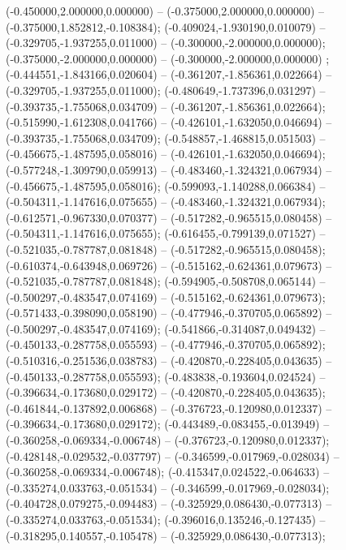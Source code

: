  (-0.450000,2.000000,0.000000) -- (-0.375000,2.000000,0.000000) -- (-0.375000,1.852812,-0.108384);
 (-0.409024,-1.930190,0.010079) -- (-0.329705,-1.937255,0.011000) -- (-0.300000,-2.000000,0.000000);
 (-0.375000,-2.000000,0.000000) -- (-0.300000,-2.000000,0.000000) ;
 (-0.444551,-1.843166,0.020604) -- (-0.361207,-1.856361,0.022664) -- (-0.329705,-1.937255,0.011000);
 (-0.480649,-1.737396,0.031297) -- (-0.393735,-1.755068,0.034709) -- (-0.361207,-1.856361,0.022664);
 (-0.515990,-1.612308,0.041766) -- (-0.426101,-1.632050,0.046694) -- (-0.393735,-1.755068,0.034709);
 (-0.548857,-1.468815,0.051503) -- (-0.456675,-1.487595,0.058016) -- (-0.426101,-1.632050,0.046694);
 (-0.577248,-1.309790,0.059913) -- (-0.483460,-1.324321,0.067934) -- (-0.456675,-1.487595,0.058016);
 (-0.599093,-1.140288,0.066384) -- (-0.504311,-1.147616,0.075655) -- (-0.483460,-1.324321,0.067934);
 (-0.612571,-0.967330,0.070377) -- (-0.517282,-0.965515,0.080458) -- (-0.504311,-1.147616,0.075655);
 (-0.616455,-0.799139,0.071527) -- (-0.521035,-0.787787,0.081848) -- (-0.517282,-0.965515,0.080458);
 (-0.610374,-0.643948,0.069726) -- (-0.515162,-0.624361,0.079673) -- (-0.521035,-0.787787,0.081848);
 (-0.594905,-0.508708,0.065144) -- (-0.500297,-0.483547,0.074169) -- (-0.515162,-0.624361,0.079673);
 (-0.571433,-0.398090,0.058190) -- (-0.477946,-0.370705,0.065892) -- (-0.500297,-0.483547,0.074169);
 (-0.541866,-0.314087,0.049432) -- (-0.450133,-0.287758,0.055593) -- (-0.477946,-0.370705,0.065892);
 (-0.510316,-0.251536,0.038783) -- (-0.420870,-0.228405,0.043635) -- (-0.450133,-0.287758,0.055593);
 (-0.483838,-0.193604,0.024524) -- (-0.396634,-0.173680,0.029172) -- (-0.420870,-0.228405,0.043635);
 (-0.461844,-0.137892,0.006868) -- (-0.376723,-0.120980,0.012337) -- (-0.396634,-0.173680,0.029172);
 (-0.443489,-0.083455,-0.013949) -- (-0.360258,-0.069334,-0.006748) -- (-0.376723,-0.120980,0.012337);
 (-0.428148,-0.029532,-0.037797) -- (-0.346599,-0.017969,-0.028034) -- (-0.360258,-0.069334,-0.006748);
 (-0.415347,0.024522,-0.064633) -- (-0.335274,0.033763,-0.051534) -- (-0.346599,-0.017969,-0.028034);
 (-0.404728,0.079275,-0.094483) -- (-0.325929,0.086430,-0.077313) -- (-0.335274,0.033763,-0.051534);
 (-0.396016,0.135246,-0.127435) -- (-0.318295,0.140557,-0.105478) -- (-0.325929,0.086430,-0.077313);
